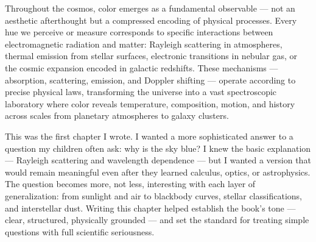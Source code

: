 Throughout the cosmos, color emerges as a fundamental observable — not an aesthetic afterthought but a compressed encoding of physical processes. Every hue we perceive or measure corresponds to specific interactions between electromagnetic radiation and matter: Rayleigh scattering in atmospheres, thermal emission from stellar surfaces, electronic transitions in nebular gas, or the cosmic expansion encoded in galactic redshifts. These mechanisms — absorption, scattering, emission, and Doppler shifting — operate according to precise physical laws, transforming the universe into a vast spectroscopic laboratory where color reveals temperature, composition, motion, and history across scales from planetary atmospheres to galaxy clusters.


\begin{commentary}
This was the first chapter I wrote. I wanted a more sophisticated answer to a question my children often ask: why is the sky blue? I knew the basic explanation --- Rayleigh scattering and wavelength dependence --- but I wanted a version that would remain meaningful even after they learned calculus, optics, or astrophysics. The question becomes more, not less, interesting with each layer of generalization: from sunlight and air to blackbody curves, stellar classifications, and interstellar dust. Writing this chapter helped establish the book's tone --- clear, structured, physically grounded --- and set the standard for treating simple questions with full scientific seriousness.
\end{commentary}